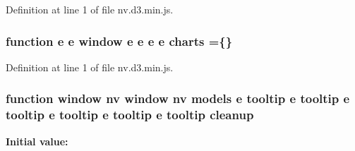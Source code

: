 Definition at line 1 of file nv.\+d3.\+min.\+js.

\subsubsection[{charts}]{\setlength{\rightskip}{0pt plus 5cm}function {\bf e} {\bf e} {\bf window} {\bf e} {\bf e} {\bf e} {\bf e} charts =\{\}}\label{nv_8d3_8min_8js_a61a8152fe30b4447ee68054e8140937c}


Definition at line 1 of file nv.\+d3.\+min.\+js.

\subsubsection[{cleanup}]{\setlength{\rightskip}{0pt plus 5cm}function {\bf window} {\bf nv} {\bf window} {\bf nv} {\bf models} {\bf e} {\bf tooltip} {\bf e} {\bf tooltip} {\bf e} {\bf tooltip} {\bf e} {\bf tooltip} {\bf e} {\bf tooltip} {\bf e} {\bf tooltip} cleanup}\label{nv_8d3_8min_8js_a29a8adc4ca98e4b5d217681b7ee2af56}
{\bfseries Initial value\+:}

